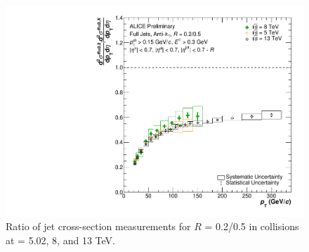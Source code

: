 \begin{figure}[h!]
    \centering
    \includegraphics[width=15cm]{figures/EnergyComparisons/RatioComparison_R05.pdf}
    \caption{Ratio of jet cross-section measurements for $R$ = 0.2/0.5 in \pp collisions at \s = 5.02, 8, and 13 TeV.}
    \label{fig:appRatioCompareR05}
\end{figure}
\fi